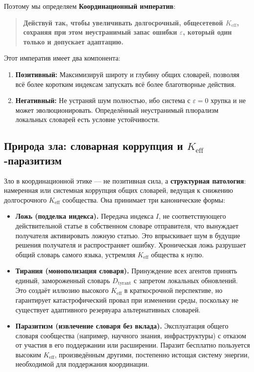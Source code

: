 \documentclass[12pt,a4paper]{article}
\begin{document}
	Поэтому мы определяем \textbf{Координационный императив}:
	
	\begin{quote}
		\textbf{Действуй так, чтобы увеличивать долгосрочный, общесетевой \(K_{\mathrm{eff}}\), сохраняя при этом неустранимый запас ошибки \(\varepsilon\), который один только и допускает адаптацию.}
	\end{quote}
	
	Этот императив имеет два компонента:
	\begin{enumerate}[leftmargin=*]
		\item \textbf{Позитивный:} Максимизируй широту и глубину общих словарей, позволяя всё более коротким индексам запускать всё более благотворные действия.
		\item \textbf{Негативный:} Не устраняй шум полностью, ибо система с \(\varepsilon = 0\) хрупка и не может эволюционировать. Определённый неустранимый плюрализм локальных словарей есть условие устойчивости.
	\end{enumerate}
	
	\subsection{Природа зла: словарная коррупция и \(K_{\mathrm{eff}}\)-паразитизм}
	
	Зло в координационной этике — не позитивная сила, а \textbf{структурная патология}: намеренная или системная коррупция общих словарей, ведущая к снижению долгосрочного \(K_{\mathrm{eff}}\) сообщества. Она принимает три канонические формы:
	
	\begin{itemize}[leftmargin=*]
		\item \textbf{Ложь (подделка индекса).} Передача индекса \(I\), не соответствующего действительной статье в собственном словаре отправителя, что вынуждает получателя активировать ложную статью. Это впрыскивает шум в будущие решения получателя и распространяет ошибку. Хроническая ложь разрушает общий словарь самого языка, устремляя \(K_{\mathrm{eff}}\) общества к нулю.
		\item \textbf{Тирания (монополизация словаря).} Принуждение всех агентов принять единый, замороженный словарь \(D_{\text{tyrant}}\) с запретом локальных обновлений. Это создаёт иллюзию высокого \(K_{\mathrm{eff}}\) в краткосрочной перспективе, но гарантирует катастрофический провал при изменении среды, поскольку не существует адаптивного резервуара альтернативных словарей.
		\item \textbf{Паразитизм (извлечение словаря без вклада).} Эксплуатация общего словаря сообщества (например, научного знания, инфраструктуры) с отказом от участия в его поддержании или расширении. Паразит бесплатно пользуется высоким \(K_{\mathrm{eff}}\), произведённым другими, постепенно истощая систему энергии, необходимой для поддержания координации.
	\end{itemize}
	
\end{document}
